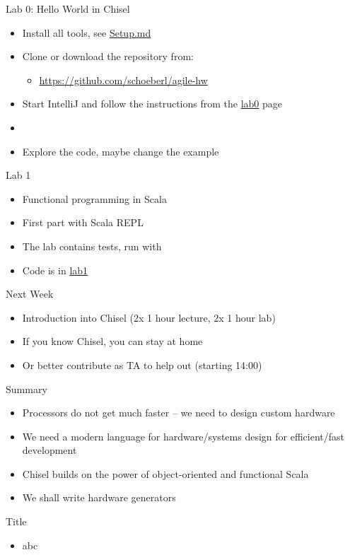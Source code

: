 \begin{frame}[fragile]{Lab 0: Hello World in Chisel}
\begin{itemize}
\item Install all tools, see \href{https://github.com/schoeberl/agile-hw/blob/main/Setup.md}{Setup.md}
\item Clone or download the repository from:
\begin{itemize}
\item \url{https://github.com/schoeberl/agile-hw}
\end{itemize}
\item Start IntelliJ and follow the instructions from the \href{https://github.com/schoeberl/agile-hw/tree/main/lab0}{lab0} page 
\item {}
\item Explore the code, maybe change the example
\end{itemize}
\end{frame}

\begin{frame}[fragile]{Lab 1}
\begin{itemize}
\item Functional programming in Scala
\item First part with Scala REPL
\item The lab contains tests, run with 
\item Code is in \href{https://github.com/schoeberl/agile-hw/tree/main/lab1}{lab1}
\end{itemize}
\end{frame}

\begin{frame}[fragile]{Next Week}
\begin{itemize}
\item Introduction into Chisel (2x 1 hour lecture, 2x 1 hour lab)
\item If you know Chisel, you can stay at home
\item Or better contribute as TA to help out (starting 14:00)
\end{itemize}
\end{frame}


\begin{frame}[fragile]{Summary}
\begin{itemize}
\item Processors do not get much faster -- we need to design custom hardware
\item We need a modern language for hardware/systems design for efficient/fast development
\item Chisel builds on the power of object-oriented and functional Scala
\item We shall write hardware generators
\end{itemize}
\end{frame}




\begin{frame}[fragile]{Title}
\begin{itemize}
\item abc
\end{itemize}
\end{frame}
